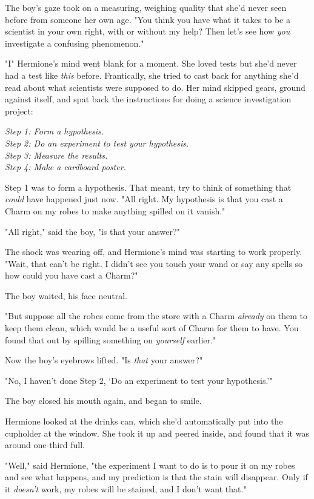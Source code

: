 The boy's gaze took on a measuring, weighing quality that she'd never seen
before from someone her own age. "You think you have what it takes to be a
scientist in your own right, with or without my help? Then let's see how
\emph{you} investigate a confusing phenomenon."

"I{\el}" Hermione's mind went blank for a moment. She loved tests but she'd
never had a test like \emph{this} before. Frantically, she tried to cast back
for anything she'd read about what scientists were supposed to do. Her mind
skipped gears, ground against itself, and spat back the instructions for doing
a science investigation project:

\emph{Step 1: Form a hypothesis.\\
Step 2: Do an experiment to test your hypothesis.\\
Step 3: Measure the results.\\
Step 4: Make a cardboard poster.}

Step 1 was to form a hypothesis. That meant, try to think of something that
\emph{could} have happened just now. "All right. My hypothesis is that you cast
a Charm on my robes to make anything spilled on it vanish."

"All right," said the boy, "is that your answer?"

The shock was wearing off, and Hermione's mind was starting to work properly.
"Wait, that can't be right. I didn't see you touch your wand or say any spells
so how could you have cast a Charm?"

The boy waited, his face neutral.

"But suppose all the robes come from the store with a Charm \emph{already} on
them to keep them clean, which would be a useful sort of Charm for them to
have. You found that out by spilling something on \emph{yourself} earlier."

Now the boy's eyebrows lifted. "Is \emph{that} your answer?"

"No, I haven't done Step 2, `Do an experiment to test your hypothesis.'"

The boy closed his mouth again, and began to smile.

Hermione looked at the drinks can, which she'd automatically put into the
cupholder at the window. She took it up and peered inside, and found that it
was around one-third full.

"Well," said Hermione, "the experiment I want to do is to pour it on my robes
and see what happens, and my prediction is that the stain will disappear. Only
if it \emph{doesn't} work, my robes will be stained, and I don't want that."

